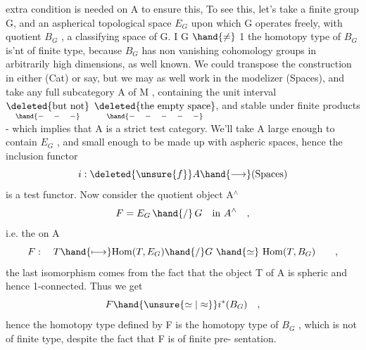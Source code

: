 
extra condition is needed on A to ensure this,  To see this, let's
take a finite group G, and an aspherical topological space $E_G$ upon
which G operates freely, with quotient $B_G$ , a classifying space of G.
I G $\hand{\neq}$ 1\hand{,} the homotopy type of $B_G$ is'nt of finite type, because $B_G$ has
non vanishing cohomology groups in arbitrarily high dimensions, as
well known. We could transpose the  construction in either (Cat) or
\hand{$\Delta^{\textcolor{black}{\wedge}}$} say, but we may as well work in the modelizer (Spaces), and take
any  full subcategory A of M , containing the unit interval \(\underset{\hand{-\quad-\quad-}}{\text{\deleted{but not}}}\)
\(\underset{\hand{-\quad-\quad-\quad-\quad-}}{\text{\deleted{the empty space}}}\), and stable under finite products - which implies
that A is a strict test category. We'll take A large enough to contain
$E_G$  , and small enough to be made up with aspheric spaces,
hence the inclusion functor
\[ i:\deleted{\unsure{f}}A \hand{\longrightarrow} \text{(Spaces)} \]
is a test functor. Now consider the quotient object \hand{\uline{\textcolor{black}{in}}} A$^{\wedge}$
\[ F = E_G \,\hand{/}\, G \quad \text{in } A^{\wedge} \quad , \]
i.e. the  on A
\[ F: \quad T \hand{\longmapsto} \mathrm{Hom}(T,E_G)\hand{/}G \ \hand{\simeq}\ \mathrm{Hom}(T,B_G) \qquad , \]
 the last isomorphism comes from the fact that the object T of A
is spheric and hence 1-connected. Thus we get
\[ F \hand{\unsure{\simeq|\approx}} i^{*}(B_G) \quad , \]
hence the homotopy type  defined by F is the homotopy type of $B_G$ ,
which is not of finite type, despite the fact that F is of finite pre-%
sentation.

